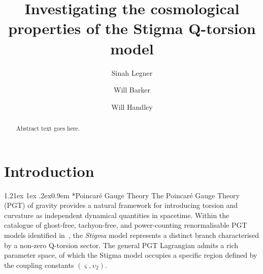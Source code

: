 \documentclass[aps,prd,reprint,preprintnumbers,showpacs,floatfix,nofootinbib,superscriptaddress]{revtex4-2}
\makeatletter
\renewcommand{\paragraph}{%
\@startsection{paragraph}{4}%
{\z@}{1.21ex \@plus 1ex \@minus .2ex}{0.9em}%
{\normalfont\normalsize\bfseries}%
}
\makeatother
\begin{document}
\title{Investigating the cosmological properties of the Stigma Q-torsion model}

\author{Sinah Legner}

\author{Will Barker}

\author{Will Handley}

\begin{abstract}
	Abstract text goes here.
\end{abstract}

\maketitle

{
\setlength{\parskip}{0pt}
\setlength{\topsep}{0pt}
\setlength{\partopsep}{0pt}
\setlength{\itemsep}{0pt}
\renewcommand{\baselinestretch}{0.8}
\tableofcontents
}
\setlength{\parskip}{6pt}

\section{Introduction}\label{sec:intro}

\paragraph*{Poincar\'e Gauge Theory} The Poincar\'e Gauge Theory (PGT) of gravity provides a natural framework for introducing torsion and curvature as independent dynamical quantities in spacetime. Within the catalogue of ghost-free, tachyon-free, and power-counting renormalisable PGT models identified in~\cite{Lin:2018awc, Lin:2019ugq}, the \emph{Stigma} model represents a distinct branch characterised by a non-zero Q-torsion sector. The general PGT Lagrangian admits a rich parameter space, of which the Stigma model occupies a specific region defined by the coupling constants $(\varsigma, \upsilon_2)$.
\end{document}
